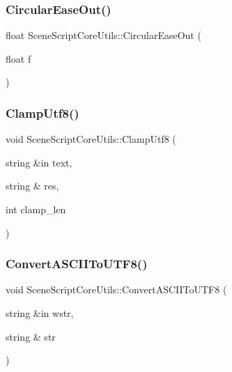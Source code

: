 \hypertarget{class_scene_script_core_utils_ad7e50ea76236ac25456065b125901b61}{}\label{class_scene_script_core_utils_ad7e50ea76236ac25456065b125901b61} 
\subsubsection{\texorpdfstring{Circular\+Ease\+Out()}{CircularEaseOut()}}
{\footnotesize\ttfamily float Scene\+Script\+Core\+Utils\+::\+Circular\+Ease\+Out (\begin{DoxyParamCaption}\item[{float}]{f }\end{DoxyParamCaption})}

\hypertarget{class_scene_script_core_utils_a37741b646b2e6f68cf3b5a320379b4a6}{}\label{class_scene_script_core_utils_a37741b646b2e6f68cf3b5a320379b4a6} 
\subsubsection{\texorpdfstring{Clamp\+Utf8()}{ClampUtf8()}}
{\footnotesize\ttfamily void Scene\+Script\+Core\+Utils\+::\+Clamp\+Utf8 (\begin{DoxyParamCaption}\item[{string \&in}]{text,  }\item[{string \&}]{res,  }\item[{int}]{clamp\+\_\+len }\end{DoxyParamCaption})}

\hypertarget{class_scene_script_core_utils_a7f1fe71148c0f4104b1ee2e618b2b275}{}\label{class_scene_script_core_utils_a7f1fe71148c0f4104b1ee2e618b2b275} 
\subsubsection{\texorpdfstring{Convert\+A\+S\+C\+I\+I\+To\+U\+T\+F8()}{ConvertASCIIToUTF8()}}
{\footnotesize\ttfamily void Scene\+Script\+Core\+Utils\+::\+Convert\+A\+S\+C\+I\+I\+To\+U\+T\+F8 (\begin{DoxyParamCaption}\item[{string \&in}]{wstr,  }\item[{string \&}]{str }\end{DoxyParamCaption})}

